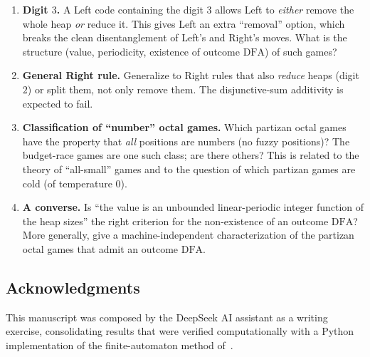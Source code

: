 \documentclass[11pt]{article}
\newcommand{\DFA}{\ensuremath{\mathrm{DFA}}}
\begin{document}
\begin{enumerate}
\item \textbf{Digit $3$.} A Left code containing the digit $3$ allows Left to \emph{either}
remove the whole heap \emph{or} reduce it. This gives Left an extra ``removal'' option, which
breaks the clean disentanglement of Left's and Right's moves. What is the structure (value,
periodicity, existence of outcome \DFA) of such games?
\item \textbf{General Right rule.} Generalize to Right rules that also \emph{reduce} heaps
(digit $2$) or split them, not only remove them. The disjunctive-sum additivity is expected to
fail.
\item \textbf{Classification of ``number'' octal games.} Which partizan octal games have the
property that \emph{all} positions are numbers (no fuzzy positions)? The budget-race games are
one such class; are there others? This is related to the theory of ``all-small'' games and to
the question of which partizan games are cold (of temperature $0$).
\item \textbf{A converse.} Is ``the value is an unbounded linear-periodic integer function of
the heap sizes'' the right criterion for the non-existence of an outcome \DFA? More generally,
give a machine-independent characterization of the partizan octal games that admit an outcome
\DFA.
\end{enumerate}

\subsection*{Acknowledgments}

This manuscript was composed by the DeepSeek AI assistant as a writing exercise, consolidating
results that were verified computationally with a Python implementation of the
finite-automaton method of~\cite{LiangFA}.



\end{document}
